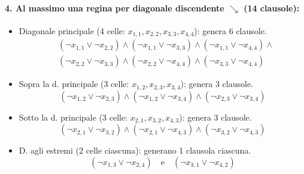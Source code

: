 \documentclass[10pt]{article}
\begin{document}
\paragraph{4. Al massimo una regina per diagonale discendente $\searrow$ (14 clausole):}
\begin{itemize}
    \item Diagonale principale (4 celle: $x_{1,1}, x_{2,2}, x_{3,3}, x_{4,4}$): genera 6 clausole.
    \[
    \begin{aligned}
        & (\neg x_{1,1} \lor \neg x_{2,2}) \land (\neg x_{1,1} \lor \neg x_{3,3}) \land (\neg x_{1,1} \lor \neg x_{4,4}) \land \\
        & (\neg x_{2,2} \lor \neg x_{3,3}) \land (\neg x_{2,2} \lor \neg x_{4,4}) \land (\neg x_{3,3} \lor \neg x_{4,4})
    \end{aligned}
    \]
    \item Sopra la d. principale (3 celle: $x_{1,2}, x_{2,3}, x_{3,4}$): genera 3 clausole.
    \[
        (\neg x_{1,2} \lor \neg x_{2,3}) \land (\neg x_{1,2} \lor \neg x_{3,4}) \land (\neg x_{2,3} \lor \neg x_{3,4})
    \]
    \item Sotto la d. principale (3 celle: $x_{2,1}, x_{3,2}, x_{4,3}$): genera 3 clausole.
    \[
        (\neg x_{2,1} \lor \neg x_{3,2}) \land (\neg x_{2,1} \lor \neg x_{4,3}) \land (\neg x_{3,2} \lor \neg x_{4,3})
    \]
    \item D. agli estremi (2 celle ciascuna): generano 1 clausola ciascuna.
    \[
        (\neg x_{1,3} \lor \neg x_{2,4}) \quad \text{e} \quad (\neg x_{3,1} \lor \neg x_{4,2})
    \]
\end{itemize}
\end{document}
